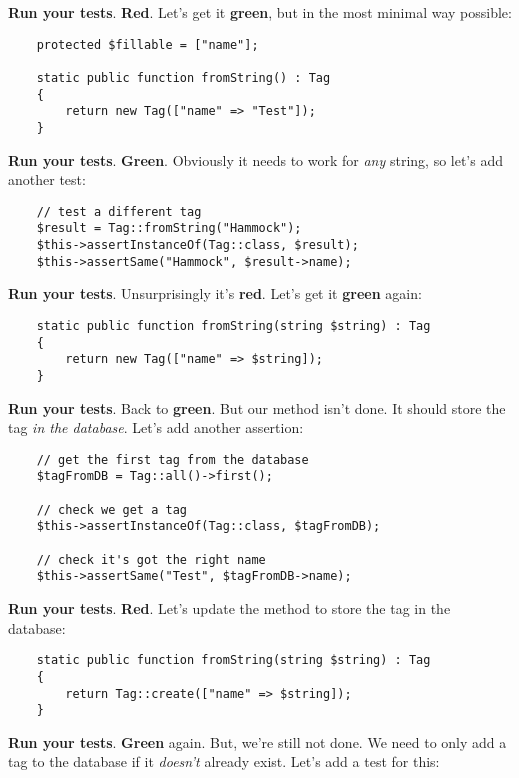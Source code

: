 \textbf{Run your tests}. \textbf{Red}. Let's get it \textbf{green}, but in the most minimal way possible:

\begin{verbatim}
    protected $fillable = ["name"];

    static public function fromString() : Tag
    {
        return new Tag(["name" => "Test"]);
    }
\end{verbatim}

\textbf{Run your tests}. \textbf{Green}. Obviously it needs to work for \textit{any} string, so let's add another test:

\begin{verbatim}
    // test a different tag
    $result = Tag::fromString("Hammock");
    $this->assertInstanceOf(Tag::class, $result);
    $this->assertSame("Hammock", $result->name);
\end{verbatim}

\textbf{Run your tests}. Unsurprisingly it's \textbf{red}. Let's get it \textbf{green} again:

\begin{verbatim}
    static public function fromString(string $string) : Tag
    {
        return new Tag(["name" => $string]);
    }
\end{verbatim}

\textbf{Run your tests}. Back to \textbf{green}. But our method isn't done. It should store the tag \textit{in the database}. Let's add another assertion:

\begin{verbatim}
    // get the first tag from the database
    $tagFromDB = Tag::all()->first();

    // check we get a tag
    $this->assertInstanceOf(Tag::class, $tagFromDB);

    // check it's got the right name
    $this->assertSame("Test", $tagFromDB->name);
\end{verbatim}

\textbf{Run your tests}. \textbf{Red}. Let's update the method to store the tag in the database:

\begin{verbatim}
    static public function fromString(string $string) : Tag
    {
        return Tag::create(["name" => $string]);
    }
\end{verbatim}

\textbf{Run your tests}. \textbf{Green} again. But, we're still not done. We need to only add a tag to the database if it \textit{doesn't} already exist. Let's add a test for this:

